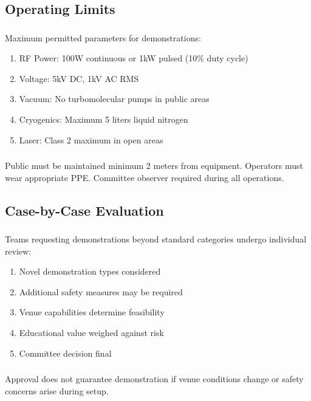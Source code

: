 \subsection{Operating Limits}

\subsubsection{}
Maximum permitted parameters for demonstrations:
\begin{enumerate}[noitemsep]
    \item RF Power: 100W continuous or 1kW pulsed (10\% duty cycle)
    \item Voltage: 5kV DC, 1kV AC RMS
    \item Vacuum: No turbomolecular pumps in public areas
    \item Cryogenics: Maximum 5 liters liquid nitrogen
    \item Laser: Class 2 maximum in open areas
\end{enumerate}

\subsubsection{}
Public must be maintained minimum 2 meters from equipment. Operators must wear appropriate PPE. Committee observer required during all operations.

\subsection{Case-by-Case Evaluation}

\subsubsection{}
Teams requesting demonstrations beyond standard categories undergo individual review:
\begin{enumerate}[noitemsep]
    \item Novel demonstration types considered
    \item Additional safety measures may be required
    \item Venue capabilities determine feasibility
    \item Educational value weighed against risk
    \item Committee decision final
\end{enumerate}

\subsubsection{}
Approval does not guarantee demonstration if venue conditions change or safety concerns arise during setup.

